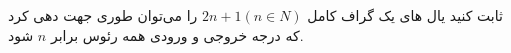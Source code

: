 \begin{PROBLEM}
	\p
	ثابت کنید یال های یک گراف کامل 
	$2n + 1 (n \in N)$
	را می‌توان طوری جهت دهی کرد که درجه خروجی و ورودی همه رئوس برابر 
	$n$
	شود.
	\SOLUTION{
		\p

	}
\end{PROBLEM}